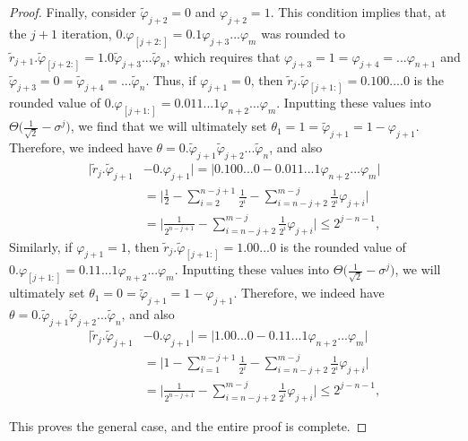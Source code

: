 \documentclass[aps,pra,showpacs,notitlepage,twocolumn,superscriptaddress,nofootinbib]{revtex4-1}
\begin{document}
\begin{proof}
Finally, consider $\tilde{\varphi}_{j+2} = 0$ and $\varphi_{j+2} = 1$. This condition implies that, at the $j+1$ iteration, $0.\varphi_{[j+2:]} = 0.1\varphi_{j+3} ... \varphi_m$ was rounded to $\tilde{r}_{j+1}.\tilde{\varphi}_{[j+2:]} = 1.0\tilde{\varphi}_{j+3} ... \tilde{\varphi}_{n} $, which requires that $\varphi_{j+3} = 1 = \varphi_{j+4} = ... \varphi_{n+1}$ and $\tilde{\varphi}_{j+3} = 0 = \tilde{\varphi}_{j+4} = ... \tilde{\varphi}_{n}$. Thus, if $\varphi_{j+1} = 0$, then $\tilde{r}_j. \tilde{\varphi}_{[j+1:]} = 0.100....0$ is the rounded value of $0.\varphi_{[j+1:]} = 0.011...1\varphi_{n+2}...\varphi_m$. Inputting these values into $\Theta\big(\frac{1}{\sqrt{2}} - \sigma^j \big)$, we find that we will ultimately set $\theta_1 = 1 =\tilde{\varphi}_{j+1} =  1-\varphi_{j+1}$. Therefore, we indeed have $\theta = 0.\tilde{\varphi}_{j+1} \tilde{\varphi}_{j+2} ... \tilde{\varphi}_{n}$, and also 
\begin{equation}
\begin{split}
    \big|\tilde{r}_j . \tilde{\varphi}_{j+1} &- 0.\varphi_{j+1}\big| = \big| 0.100...0 - 0.011...1\varphi_{n+2} ... \varphi_{m} \big| \\ 
    &= \Big|\frac{1}{2} - \sum_{i=2}^{n-j+1}\frac{1}{2^i} - \sum_{i=n-j+2}^{m-j}\frac{1}{2^{i}}\varphi_{j+i} \Big| \\
    &= \Big|\frac{1}{2^{n-j+1}} - \sum_{i=n-j+2}^{m-j}\frac{1}{2^{i}}\varphi_{j+i} \Big| \leq 2^{j-n-1},
\end{split}
\end{equation}
Similarly, if $\varphi_{j+1} = 1$, then $\tilde{r}_j . \tilde{\varphi}_{[j+1:]} = 1.00...0$ is the rounded value of $0.\varphi_{[j+1:]} = 0.11...1\varphi_{n+2}...\varphi_m$. Inputting these values into $\Theta\big(\frac{1}{\sqrt{2}} - \sigma^j \big)$, we will ultimately set $\theta_1 = 0 = \tilde{\varphi}_{j+1} = 1-\varphi_{j+1}$. Therefore, we indeed have $\theta = 0.\tilde{\varphi}_{j+1} \tilde{\varphi}_{j+2} ... \tilde{\varphi}_{n}$, and also 
\begin{equation}
\begin{split}
    \big|\tilde{r}_j . \tilde{\varphi}_{j+1} &- 0.\varphi_{j+1}\big| = \big| 1.00...0 - 0.11...1\varphi_{n+2} ... \varphi_{m} \big| \\
    &= \Big|1 - \sum_{i=1}^{n-j+1}\frac{1}{2^i} - \sum_{i=n-j+2}^{m-j}\frac{1}{2^{i}}\varphi_{j+i} \Big| \\
    &= \Big|\frac{1}{2^{n-j+1}} - \sum_{i=n-j+2}^{m-j}\frac{1}{2^{i}}\varphi_{j+i} \Big| \leq 2^{j-n-1},
\end{split}
\end{equation}

This proves the general case, and the entire proof is complete.

\end{proof} 
\end{document}
